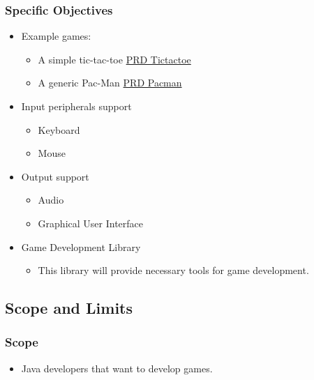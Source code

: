 \subsubsection{Specific Objectives}
\begin{itemize}
    \item Example games:
    \begin{itemize}
        \item A simple tic-tac-toe \href{https://docs.google.com/document/d/1MvlmgCBZvRrT61A3mnra-3bZ41zCcE_vmNHpHkZyQ2M/edit}{PRD Tictactoe}
        \item A generic Pac-Man \href{https://docs.google.com/document/d/1ST29Ap_2OGVEf--gPTfHYmAZrcIQC6jl6y32fM3UQWo/edit}{PRD Pacman}
    \end{itemize}
    \item Input peripherals support
    \begin{itemize}
        \item Keyboard
        \item Mouse
    \end{itemize}
    \item Output support
    \begin{itemize}
        \item Audio
        \item Graphical User Interface
    \end{itemize}
    \item Game Development Library
    \begin{itemize}
        \item This library will provide necessary tools for game development.
    \end{itemize}
\end{itemize}

\subsection{Scope and Limits}

\subsubsection{Scope}
\begin{itemize}
    \item Java developers that want to develop games.
\end{itemize}

